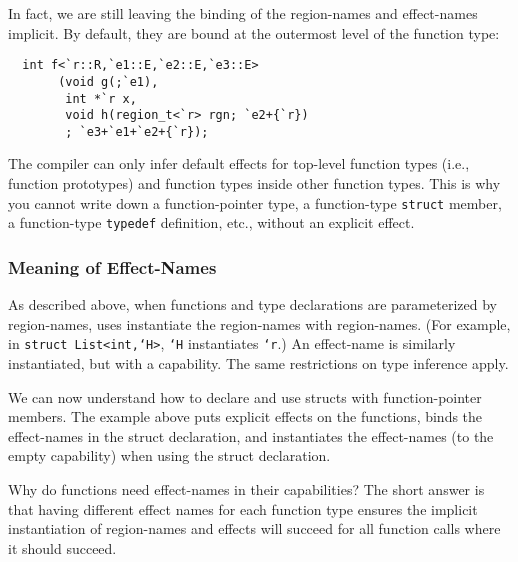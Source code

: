In fact, we are still leaving the binding of the region-names and
effect-names implicit.  By default, they are bound at the outermost
level of the function type:
\begin{verbatim}
  int f<`r::R,`e1::E,`e2::E,`e3::E>
       (void g(;`e1), 
        int *`r x, 
        void h(region_t<`r> rgn; `e2+{`r})
        ; `e3+`e1+`e2+{`r});
\end{verbatim}

The compiler can only infer default effects for top-level function
types (i.e., function prototypes) and function types inside other
function types.  This is why you cannot write down a function-pointer
type, a function-type \texttt{struct} member, a function-type
\texttt{typedef} definition, etc., without an explicit effect.

\subsubsection{Meaning of Effect-Names}

As described above, when functions and type declarations are
parameterized by region-names, uses instantiate the region-names with
region-names.  (For example, in \texttt{struct List<int,`H>}, \texttt{`H}
instantiates \texttt{`r}.)  An effect-name is similarly instantiated,
but with a capability.  The same restrictions on type inference apply.

We can now understand how to declare and use structs with
function-pointer members.  The example above puts explicit effects on
the functions, binds the effect-names in the struct declaration, and
instantiates the effect-names (to the empty capability) when using the
struct declaration.

Why do functions need effect-names in their capabilities?  The short
answer is that having different effect names for each function type
ensures the implicit instantiation of region-names and effects will
succeed for all function calls where it should succeed.

